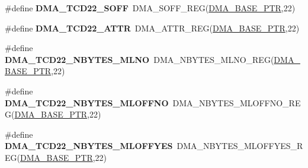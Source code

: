 \begin{DoxyCompactItemize}
\item 
\hypertarget{group___d_m_a___register___accessor___macros_gaa91bc923d65aa095642d2c6592b9ad52}{}\#define {\bfseries D\+M\+A\+\_\+\+T\+C\+D22\+\_\+\+S\+O\+F\+F}~D\+M\+A\+\_\+\+S\+O\+F\+F\+\_\+\+R\+E\+G(\hyperlink{group___d_m_a___peripheral_ga6997fbc1b1973e9f27170217a3bd6f22}{D\+M\+A\+\_\+\+B\+A\+S\+E\+\_\+\+P\+T\+R},22)\label{group___d_m_a___register___accessor___macros_gaa91bc923d65aa095642d2c6592b9ad52}

\item 
\hypertarget{group___d_m_a___register___accessor___macros_ga5c008293591510d3a8be7af312b4e2ab}{}\#define {\bfseries D\+M\+A\+\_\+\+T\+C\+D22\+\_\+\+A\+T\+T\+R}~D\+M\+A\+\_\+\+A\+T\+T\+R\+\_\+\+R\+E\+G(\hyperlink{group___d_m_a___peripheral_ga6997fbc1b1973e9f27170217a3bd6f22}{D\+M\+A\+\_\+\+B\+A\+S\+E\+\_\+\+P\+T\+R},22)\label{group___d_m_a___register___accessor___macros_ga5c008293591510d3a8be7af312b4e2ab}

\item 
\hypertarget{group___d_m_a___register___accessor___macros_ga922cb6641633275a4463eb3a6a19e784}{}\#define {\bfseries D\+M\+A\+\_\+\+T\+C\+D22\+\_\+\+N\+B\+Y\+T\+E\+S\+\_\+\+M\+L\+N\+O}~D\+M\+A\+\_\+\+N\+B\+Y\+T\+E\+S\+\_\+\+M\+L\+N\+O\+\_\+\+R\+E\+G(\hyperlink{group___d_m_a___peripheral_ga6997fbc1b1973e9f27170217a3bd6f22}{D\+M\+A\+\_\+\+B\+A\+S\+E\+\_\+\+P\+T\+R},22)\label{group___d_m_a___register___accessor___macros_ga922cb6641633275a4463eb3a6a19e784}

\item 
\hypertarget{group___d_m_a___register___accessor___macros_ga70db120b6df8e5b5deb880d86b75e240}{}\#define {\bfseries D\+M\+A\+\_\+\+T\+C\+D22\+\_\+\+N\+B\+Y\+T\+E\+S\+\_\+\+M\+L\+O\+F\+F\+N\+O}~D\+M\+A\+\_\+\+N\+B\+Y\+T\+E\+S\+\_\+\+M\+L\+O\+F\+F\+N\+O\+\_\+\+R\+E\+G(\hyperlink{group___d_m_a___peripheral_ga6997fbc1b1973e9f27170217a3bd6f22}{D\+M\+A\+\_\+\+B\+A\+S\+E\+\_\+\+P\+T\+R},22)\label{group___d_m_a___register___accessor___macros_ga70db120b6df8e5b5deb880d86b75e240}

\item 
\hypertarget{group___d_m_a___register___accessor___macros_ga101358ed1f79b02f770c84beeaa1e363}{}\#define {\bfseries D\+M\+A\+\_\+\+T\+C\+D22\+\_\+\+N\+B\+Y\+T\+E\+S\+\_\+\+M\+L\+O\+F\+F\+Y\+E\+S}~D\+M\+A\+\_\+\+N\+B\+Y\+T\+E\+S\+\_\+\+M\+L\+O\+F\+F\+Y\+E\+S\+\_\+\+R\+E\+G(\hyperlink{group___d_m_a___peripheral_ga6997fbc1b1973e9f27170217a3bd6f22}{D\+M\+A\+\_\+\+B\+A\+S\+E\+\_\+\+P\+T\+R},22)\label{group___d_m_a___register___accessor___macros_ga101358ed1f79b02f770c84beeaa1e363}


\end{DoxyCompactItemize}
